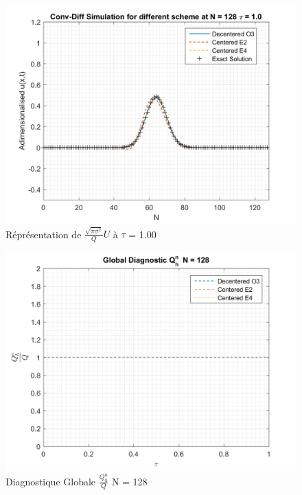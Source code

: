 \documentclass{article}
\begin{document}
\begin{figure}[H]
    \centering
    \includegraphics[scale=0.45]{img/fig5d.png}
    \caption{Réprésentation de $\frac{\sqrt{\pi \sigma^2}}{Q} U$ à $\tau$ = 1.00}
    \label{fig5d}
\end{figure}
\begin{figure}[H]
    \centering
    \includegraphics[scale=0.45]{img/fig7a.png}
    \caption{Diagnostique Globale $\frac{Q_h^n}{Q}$ N = 128}
    \label{fig7a}
\end{figure}
\end{document}
